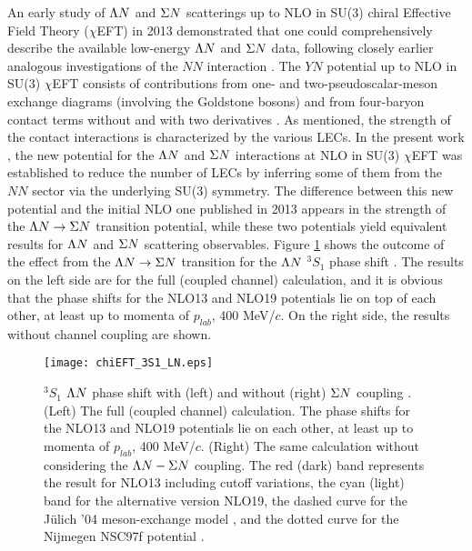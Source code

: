 An early study of $\Lambda N$ and $\Sigma N$ scatterings up to NLO in SU(3) chiral Effective Field Theory ($\chi$EFT) in 2013 demonstrated that one could comprehensively describe the available low-energy $\Lambda N$ and $\Sigma N$ data, following closely earlier analogous investigations of the $NN$ interaction \cite{chiEFT-2013}. The $YN$ potential up to NLO in SU(3) $\chi$EFT consists of contributions from one- and two-pseudoscalar-meson exchange diagrams (involving the Goldstone bosons) and from four-baryon contact terms without and with two derivatives \cite{chiEFT-2020}. As mentioned, the strength of the contact interactions is characterized by the various LECs. In the present work \cite{chiEFT-2020}, the new potential for the $\Lambda N$ and $\Sigma N$ interactions at NLO in SU(3) $\chi$EFT was established to reduce the number of LECs by inferring some of them from the $NN$ sector via the underlying SU(3) symmetry. The difference between this new potential and the initial NLO one published in 2013 \cite{chiEFT-2013} appears in the strength of the $\Lambda N\to\Sigma N$ transition potential, while these two potentials yield equivalent results for $\Lambda N$ and $\Sigma N$ scattering observables. Figure \ref{fig-chiEFT_3S1_LN} shows the outcome of the effect from the $\Lambda N\to\Sigma N$ transition for the $\Lambda N$ $^3S_1$ phase shift \cite{chiEFT-2020}. The results on the left side are for the full (coupled channel) calculation, and it is obvious that the phase shifts for the NLO13 and NLO19 potentials lie on top of each other, at least up to momenta of $p_{lab}$, 400 MeV/$c$. On the right side, the results without channel coupling are shown.
\begin{figure}[h]
 \begin{center}
   \texttt{[image: chiEFT\_3S1\_LN.eps]}
   \caption{$^3S_1$ $\Lambda N$ phase shift with (left) and without (right) $\Sigma N$ coupling \cite{chiEFT-2020}. (Left) The full (coupled channel) calculation. The phase shifts for the NLO13 and NLO19 potentials lie on each other, at least up to momenta of $p_{lab}$, 400 MeV/$c$. (Right) The same calculation without considering the $\Lambda N - \Sigma N$ coupling. The red (dark) band represents the result for NLO13 \cite{NLO13} including cutoff variations, the cyan (light) band for the alternative version NLO19, the dashed curve for the J\"{u}lich '04 meson-exchange model \cite{chiEFT-2005}, and the dotted curve for the Nijmegen NSC97f potential \cite{NSC97f}.}
   \label{fig-chiEFT_3S1_LN}
 \end{center}
\end{figure}

